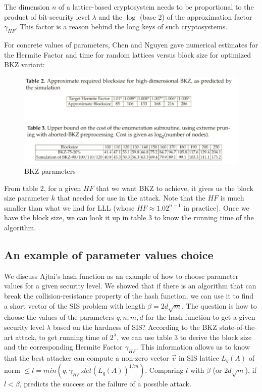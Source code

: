 \begin{remark}
  The dimension $n$ of a lattice-based cryptosystem needs to be proportional to
  the product of bit-security level $\lambda$ and the $\log$ (base 2) of the
  approximation factor $\gamma_{HF}$.  This factor is a reason behind the long
  keys of such cryptosystems.
  \label{rem:dimension}
\end{remark}

For concrete values of parameters, Chen and Nguyen \cite{chen2011bkz} gave
numerical estimates for the Hermite Factor and time for random lattices versus block
size for optimized BKZ variant:

\begin{figure}[h]
  \centering \includegraphics[scale=0.3]{bkzparams}
  \caption{BKZ parameters}
  \label{fig:BKZParams}
\end{figure}

From table 2, for a given $HF$ that we want BKZ to achieve, it gives us the
block size parameter $k$ that needed for use in the attack. Note that the $HF$ is much
smaller than what we had for LLL (whose $HF \approx 1.02^{n-1}$ in
practice). Once we have the block size, we can look it up in table 3 to know the
running time of the algorithm.

\subsection{An example of parameter values choice}
\label{sec:parameterChoice}
We discuss Ajtai's hash function as an example of how to choose parameter values for
a given security level. We showed that if there is an algorithm that can break the
collision-resistance property of the hash function, we can use it to find a
short vector of the SIS problem with length $\beta = 2d\sqrt{m}$. The question
is how to choose the values of the parameters $q,n,m,d$ for the hash function to get a
given security level $\lambda$ based on the hardness of SIS? According to the
BKZ state-of-the-art attack, to get running time of $2^\lambda$, we can use
table 3 to derive the block size and the corresponding Hermite Factor $\gamma_{HF}$.
This information allows us to know that the best attacker can compute a non-zero vector $\vec{v}$ in SIS
lattice $L_q(A)$ of norm $\leq l = min(q, \gamma_{HF}.det(L_q(A))^{1/m})$. 
Comparing $l$ with $\beta$ (or $2d\sqrt{m}$), if $l < \beta$, predicts the success or the failure of a possible attack.

